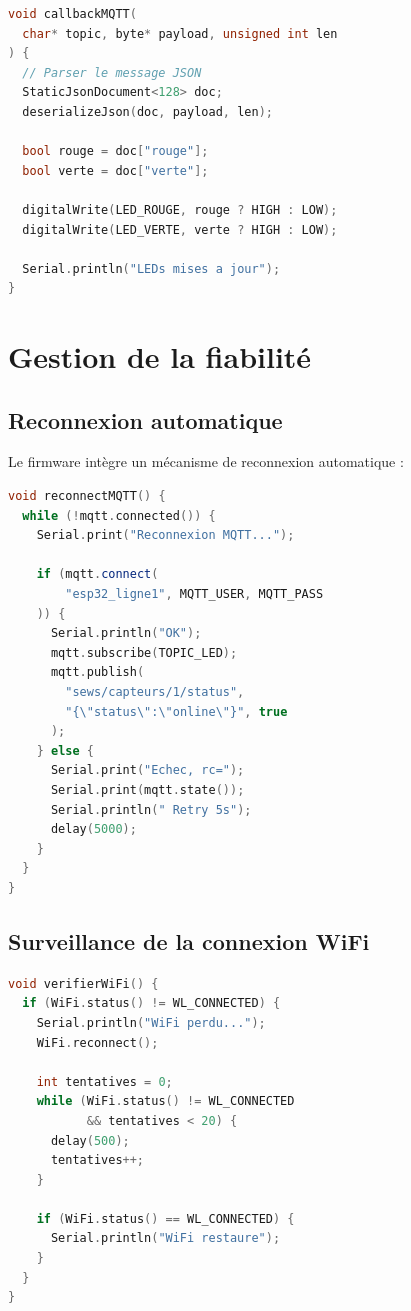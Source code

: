 \begin{lstlisting}[language=C++,
caption={Callback MQTT pour les commandes LED},
label={lst:callback_mqtt}]
void callbackMQTT(
  char* topic, byte* payload, unsigned int len
) {
  // Parser le message JSON
  StaticJsonDocument<128> doc;
  deserializeJson(doc, payload, len);
  
  bool rouge = doc["rouge"];
  bool verte = doc["verte"];
  
  digitalWrite(LED_ROUGE, rouge ? HIGH : LOW);
  digitalWrite(LED_VERTE, verte ? HIGH : LOW);
  
  Serial.println("LEDs mises a jour");
}
\end{lstlisting}

\section{Gestion de la fiabilit\'e}

\subsection{Reconnexion automatique}

Le firmware int\`egre un m\'ecanisme de reconnexion automatique :

\begin{lstlisting}[language=C++,
caption={Reconnexion MQTT},label={lst:reconnect}]
void reconnectMQTT() {
  while (!mqtt.connected()) {
    Serial.print("Reconnexion MQTT...");
    
    if (mqtt.connect(
        "esp32_ligne1", MQTT_USER, MQTT_PASS
    )) {
      Serial.println("OK");
      mqtt.subscribe(TOPIC_LED);
      mqtt.publish(
        "sews/capteurs/1/status",
        "{\"status\":\"online\"}", true
      );
    } else {
      Serial.print("Echec, rc=");
      Serial.print(mqtt.state());
      Serial.println(" Retry 5s");
      delay(5000);
    }
  }
}
\end{lstlisting}

\subsection{Surveillance de la connexion WiFi}

\begin{lstlisting}[language=C++,
caption={Surveillance WiFi},label={lst:watchdog_wifi}]
void verifierWiFi() {
  if (WiFi.status() != WL_CONNECTED) {
    Serial.println("WiFi perdu...");
    WiFi.reconnect();
    
    int tentatives = 0;
    while (WiFi.status() != WL_CONNECTED 
           && tentatives < 20) {
      delay(500);
      tentatives++;
    }
    
    if (WiFi.status() == WL_CONNECTED) {
      Serial.println("WiFi restaure");
    }
  }
}
\end{lstlisting}

